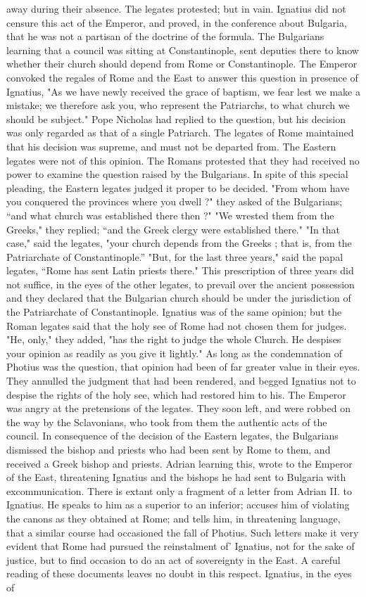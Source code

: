 away during their absence. The legates protested; but in vain. Ignatius did not censure this act of the Emperor, and proved, in the conference about Bulgaria, that he was not a partisan of the doctrine of the formula. The Bulgarians learning that a council was sitting at Constantinople, sent deputies there to know whether their church should depend from Rome or Constantinople. The Emperor convoked the regales of Rome and the East to answer this question in presence of Ignatius, "As we have newly received the grace of baptism, we fear lest we make a mistake; we therefore ask you, who represent the Patriarchs, to what church we should be subject." Pope Nicholas had replied to the question, but his decision was only regarded as that of a single Patriarch. The legates of Rome maintained that his decision was supreme, and must not be departed from. The Eastern legates were not of this opinion. The Romans protested that they had received no power to examine the question raised by the Bulgarians. In spite of this special pleading, the Eastern legates judged it proper to be decided. "From whom have you conquered the provinces where you dwell ?" they asked of the Bulgarians; “and what church was established there then ?" "We wrested them from the Greeks," they replied; “and the Greek clergy were established there." "In that case," said the legates, "your church depends from the Greeks ; that is, from the Patriarchate of Constantinople.” "But, for the last three years," said the papal legates, “Rome has sent Latin priests there." This prescription of three years did not suffice, in the eyes of the other legates, to prevail over the ancient possession and they declared that the Bulgarian church should be under the jurisdiction of the Patriarchate of Constantinople. Ignatius was of the same opinion; but the Roman legates said that the holy see of Rome had not chosen them for judges. "He, only," they added, "has the right to judge the whole Church. He despises your opinion as readily as you give it lightly." As long as the condemnation of Photius was the question, that opinion had been of far greater value in their eyes. They annulled the judgment that had been rendered, and begged Ignatius not to despise the rights of the holy see, which had restored him to his. The Emperor was angry at the pretensions of the legates. They soon left, and were robbed on the way by the Sclavonians, who took from them the authentic acts of the council. In consequence of the decision of the Eastern legates, the Bulgarians dismissed the bishop and priests who had been sent by Rome to them, and received a Greek bishop and priests. Adrian learning this, wrote to the Emperor of the East, threatening Ignatius and the bishops he had sent to Bulgaria with excommunication. There is extant only a fragment of a letter from Adrian II. to Ignatius. He speaks to him as a superior to an inferior; accuses him of violating the canons as they obtained at Rome; and tells him, in threatening language, that a similar course had occasioned the fall of Photius. Such letters make it very evident that Rome had pursued the reinstalment of' Ignatius, not for the sake of justice, but to find occasion to do an act of sovereignty in the East. A careful reading of these documents leaves no doubt in this respect. Ignatius, in the eyes of 